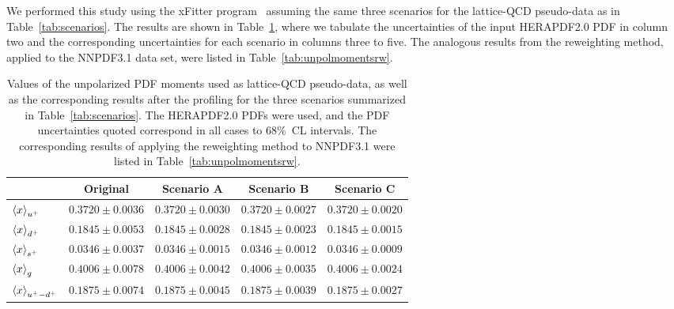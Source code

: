 We performed this study using the xFitter program~\cite{Alekhin:2014irh}
assuming the same three scenarios for the lattice-QCD pseudo-data as 
in Table~\ref{tab:scenarios}. 
%
The results are shown in Table~\ref{tab:unpolmomentsProf}, where we tabulate 
the uncertainties of the input HERAPDF2.0 PDF in column two and the 
corresponding uncertainties for each scenario in columns three to five. 
%
The analogous results from the reweighting method, applied to the 
NNPDF3.1 data set, were listed in Table~\ref{tab:unpolmomentsrw}.

\begin{table}[!t]
\centering
\footnotesize
\renewcommand{\arraystretch}{1.3} 
\begin{tabular}{lcccc}
\toprule 
&  Original  & Scenario A  &  Scenario B  &  Scenario C  \\
\midrule
  $\left\langle x\right\rangle_{u^+}$     
&  $0.3720\pm 0.0036$  
&  $0.3720\pm 0.0030$  
&  $0.3720\pm 0.0027$  
&  $0.3720\pm 0.0020$ \\
  $\left\langle x\right\rangle_{d^+}$     
&  $0.1845\pm 0.0053$  
&  $0.1845\pm 0.0028$  
&  $0.1845\pm 0.0023$  
&  $0.1845\pm 0.0015$ \\
  $\left\langle x\right\rangle_{s^+}$     
&  $0.0346\pm 0.0037$  
&  $0.0346\pm 0.0015$  
&  $0.0346\pm 0.0012$  
&  $0.0346\pm 0.0009$ \\
  $\left\langle x\right\rangle_{g}$       
&  $0.4006\pm 0.0078$  
&  $0.4006\pm 0.0042$  
&  $0.4006\pm 0.0035$  
&  $0.4006\pm 0.0024$ \\
  $\left\langle x\right\rangle_{u^+-d^+}$ 
&  $0.1875\pm 0.0074$  
&  $0.1875\pm 0.0045$  
&  $0.1875\pm 0.0039$  
&  $0.1875\pm 0.0027$ \\
\bottomrule
\end{tabular}
\caption{\small Values of the unpolarized PDF moments
  used as lattice-QCD pseudo-data, as well as the corresponding results
  after the profiling  for the
three scenarios summarized in Table~\ref{tab:scenarios}.
%
The HERAPDF2.0 PDFs were used, and the PDF uncertainties quoted correspond in all cases to 68\%~CL intervals.
%
The corresponding results of applying the reweighting method
to NNPDF3.1 were listed in Table~\ref{tab:unpolmomentsrw}.
\label{tab:unpolmomentsProf}
}
\end{table}


